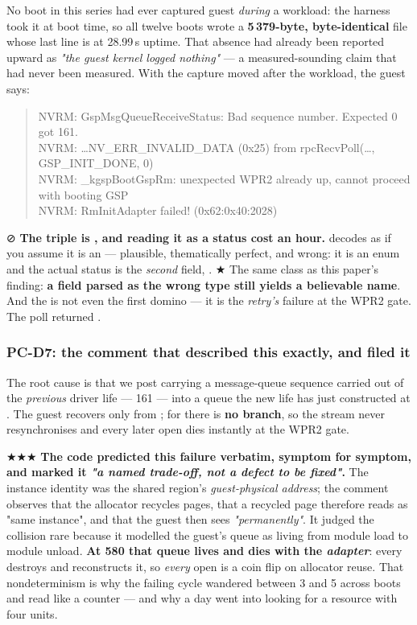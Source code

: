 \documentclass[10.5pt]{article}
\begin{document}
No boot in this series had ever captured guest  \emph{during} a workload: the harness
took it at boot time, so all twelve boots wrote a \textbf{5\,379-byte, byte-identical} file whose
last line is at 28.99\,s uptime. That absence had already been reported upward as
\emph{"the guest kernel logged nothing"} --- a measured-sounding claim that had never been
measured. With the capture moved after the workload, the guest says:

\begin{quote}\small\ttfamily
NVRM: GspMsgQueueReceiveStatus: Bad sequence number.  Expected 0 got 161.\\
NVRM: \ldots NV\_ERR\_INVALID\_DATA (0x25) from rpcRecvPoll(\ldots, GSP\_INIT\_DONE, 0)\\
NVRM: \_kgspBootGspRm: unexpected WPR2 already up, cannot proceed with booting GSP\\
NVRM: RmInitAdapter failed! (0x62:0x40:2028)
\end{quote}

⊘ \textbf{The triple is , and reading it as a status cost an
hour.}  decodes as  if you assume it is an
 --- plausible, thematically perfect, and wrong: it is an  enum
and the actual status is the \emph{second} field, . ★ The same class as this paper's
 finding: \textbf{a field parsed as the wrong type still yields a believable
name}. And the  is not even the first domino --- it is the \emph{retry's} failure at
the WPR2 gate. The poll returned .

\subsubsection*{PC-D7: the comment that described this exactly, and filed it}

The root cause is that we post  carrying a message-queue sequence carried
out of the \emph{previous} driver life --- 161 --- into a queue the new life has just constructed
at . The guest recovers only from ; for \code{>} there
is \textbf{no branch}, so the stream never resynchronises and every later open dies instantly at
the WPR2 gate.

★★★ \textbf{The code predicted this failure verbatim, symptom for symptom, and marked it
\emph{"a named trade-off, not a defect to be fixed"}.} The instance identity was the shared
region's \emph{guest-physical address}; the comment observes that the allocator recycles pages,
that a recycled page therefore reads as "same instance", and that the guest then sees
 \emph{"permanently"}. It judged the collision rare because it modelled
the guest's queue as living from module load to module unload. \textbf{At 580 that queue lives and
dies with the \emph{adapter}}: every  destroys and reconstructs it, so
\emph{every} open is a coin flip on allocator reuse. That nondeterminism is why the failing
cycle wandered between 3 and 5 across boots and read like a counter --- and why a day went into
looking for a resource with four units.
\end{document}
